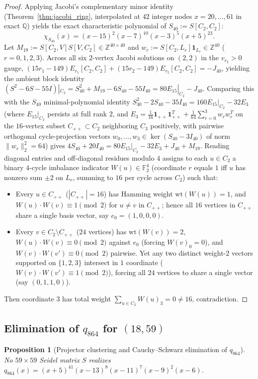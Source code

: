 \documentclass[11pt,reqno]{amsart}
\newtheorem{proposition}[theorem]{Proposition}
\theoremstyle{definition}
\theoremstyle{remark}
\numberwithin{equation}{section}
\numberwithin{table}{section}
\begin{document}
\begin{proof}
Applying Jacobi's complementary minor identity (Theorem~\ref{thm:jacobi_ring}, interpolated at $42$ integer nodes $x = 20, \dots, 61$ in exact $\mathbb{Q}$) yields the exact characteristic polynomial of $S_{40} := S[C_2, C_2]$:
\[
  \chi_{S_{40}}(x) = (x - 15)^2 (x - 7)^{10} (x - 3)^5 (x + 5)^{23}.
\]
Let $M_{19} := S[C_2, V]S[V, C_2] \in \mathbb{Z}^{40 \times 40}$ and $w_r := S[C_2, L_r]\mathbf{1}_{L_r} \in \mathbb{Z}^{40}$ ($r = 0, 1, 2, 3$). Across all six $2$-vertex Jacobi solutions on $(2, 2)$ in the $v_{r_2} > 0$ gauge, $(15r_1 - 149)E_{r_1}[C_2, C_2] + (15r_2 - 149)E_{r_2}[C_2, C_2] = -J_{40}$, yielding the ambient block identity $(S^2 - 6S - 55I)|_{C_2} = S_{40}^2 + M_{19} - 6S_{40} - 55I_{40} = 80 E_{15}|_{C_2} - J_{40}$. Comparing this with the $S_{40}$ minimal-polynomial identity $S_{40}^2 - 2S_{40} - 35I_{40} = 160 E_{15}|_{C_2} - 32 E_3$ (where $E_{15}|_{C_2}$ persists at full rank $2$, and $E_3 = \frac{1}{16}\mathbf{1}_{++}\mathbf{1}_{++}^T + \frac{1}{64}\sum_{r=0}^3 w_r w_r^T$ on the $16$-vertex subset $C_{++} \subset C_2$ neighboring $C_3$ positively, with pairwise orthogonal cycle-projection vectors $w_0, \dots, w_3 \in \ker(S_{40} - 3I_{40})$ of norm $\|w_r\|_2^2 = 64$) gives $4S_{40} + 20I_{40} = 80 E_{15}|_{C_2} - 32 E_3 + J_{40} + M_{19}$. Reading diagonal entries and off-diagonal residues modulo $4$ assigns to each $u \in C_2$ a binary $4$-cycle imbalance indicator $W(u) \in \mathbb{F}_2^4$ (coordinate $r$ equals $1$ iff $u$ has nonzero sum $\pm 2$ on $L_r$, summing to $16$ per cycle across $C_2$) such that:
\begin{itemize}
  \item Every $u \in C_{++}$ ($|C_{++}| = 16$) has Hamming weight $\mathrm{wt}(W(u)) = 1$, and $W(u) \cdot W(v) \equiv 1 \pmod 2$ for $u \neq v$ in $C_{++}$; hence all $16$ vertices in $C_{++}$ share a single basis vector, say $e_0 = (1, 0, 0, 0)$.
  \item Every $v \in C_2 \setminus C_{++}$ ($24$ vertices) has $\mathrm{wt}(W(v)) = 2$, $W(u) \cdot W(v) \equiv 0 \pmod 2$ against $e_0$ (forcing $W(v)_0 = 0$), and $W(v) \cdot W(v') \equiv 0 \pmod 2$ pairwise. Yet any two distinct weight-$2$ vectors supported on $\{1, 2, 3\}$ intersect in $1$ coordinate ($W(v)\cdot W(v') \equiv 1 \pmod 2$), forcing all $24$ vertices to share a single vector (say $(0, 1, 1, 0)$).
\end{itemize}
Then coordinate $3$ has total weight $\sum_{u \in C_2} W(u)_3 = 0 \neq 16$, contradiction.
\end{proof}

\subsection{Elimination of \texorpdfstring{$q_{864}$}{q\_864} for \texorpdfstring{$(18, 59)$}{(18, 59)}}
\begin{proposition}[Projector clustering and Cauchy--Schwarz elimination of $q_{864}$]\label{prop:kill864}
No $59 \times 59$ Seidel matrix $S$ realizes $q_{864}(x) = (x + 5)^{41}(x - 13)^8(x - 11)^7(x - 9)^2(x - 6)$.
\end{proposition}
\end{document}
